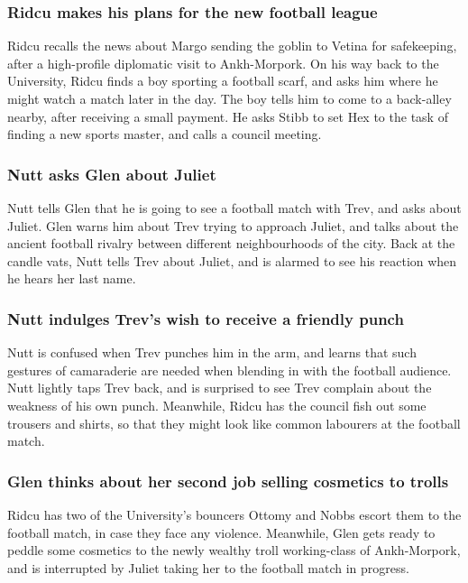 \subsubsection{\Gls{Ridcu} makes his plans for the new football league}
\Gls{Ridcu} recalls the news about \Gls{Margo} sending the goblin to \Gls{Vetina} for safekeeping,
after a high-profile diplomatic visit to Ankh-Morpork. On his way back to the University,
\Gls{Ridcu} finds a boy sporting a football scarf, and asks him where he might watch a match later
in the day. The boy tells him to come to a back-alley nearby, after receiving a small payment. He
asks \Gls{Stibb} to set \Gls{Hex} to the task of finding a new sports master, and calls a council
meeting.

\subsubsection{\Gls{Nutt} asks \Gls{Glen} about \Gls{Juliet}}
\Gls{Nutt} tells \Gls{Glen} that he is going to see a football match with \Gls{Trev}, and asks
about \Gls{Juliet}. \Gls{Glen} warns him about \Gls{Trev} trying to approach \Gls{Juliet}, and
talks about the ancient football rivalry between different neighbourhoods of the city. Back at
the candle vats, \Gls{Nutt} tells \Gls{Trev} about \Gls{Juliet}, and is alarmed to see his reaction
when he hears her last name.

\subsubsection{\Gls{Nutt} indulges \Gls{Trev}'s wish to receive a friendly punch}
\Gls{Nutt} is confused when \Gls{Trev} punches him in the arm, and learns that such gestures of
camaraderie are needed when blending in with the football audience. \Gls{Nutt} lightly taps
\Gls{Trev} back, and is surprised to see \Gls{Trev} complain about the weakness of his own punch.
Meanwhile, \Gls{Ridcu} has the council fish out some trousers and shirts, so that they might look
like common labourers at the football match.

\subsubsection{\Gls{Glen} thinks about her second job selling cosmetics to trolls}
\Gls{Ridcu} has two of the University's bouncers \Gls{Ottomy} and \Gls{Nobbs} escort them to the
football match, in case they face any violence. Meanwhile, \Gls{Glen} gets ready to peddle some
cosmetics to the newly wealthy troll working-class of Ankh-Morpork, and is interrupted by
\Gls{Juliet} taking her to the football match in progress.

